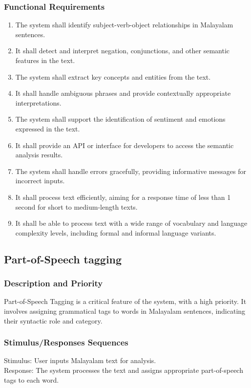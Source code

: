\documentclass[12pt]{article}
\begin{document}
	\subsubsection{Functional Requirements}
	\begin{enumerate}
		\item The system shall identify subject-verb-object relationships in Malayalam
		sentences.
		\item It shall detect and interpret negation, conjunctions, and other semantic features in
		the text.
		\item The system shall extract key concepts and entities from the text.
		\item It shall handle ambiguous phrases and provide contextually appropriate
		interpretations.
		\item The system shall support the identification of sentiment and emotions expressed in
		the text.
		\item It shall provide an API or interface for developers to access the semantic analysis
		results.
		\item The system shall handle errors gracefully, providing informative messages for
		incorrect inputs.
		\item It shall process text efficiently, aiming for a response time of less than 1 second for
		short to medium-length texts.
		\item It shall be able to process text with a wide range of vocabulary and language
		complexity levels, including formal and informal language variants.
	\end{enumerate}
	
	\subsection{Part-of-Speech tagging}
	
	\subsubsection{Description and Priority}
	Part-of-Speech Tagging is a critical feature of the system, with a high priority. It involves
	assigning grammatical tags to words in Malayalam sentences, indicating their syntactic
	role and category.
	
	\subsubsection{Stimulus/Responses Sequences}
	Stimulus: User inputs Malayalam text for analysis.\\
	Response: The system processes the text and assigns appropriate part-of-speech tags to
	each word.
	
\end{document}
